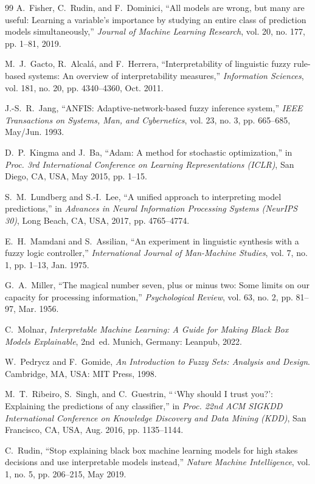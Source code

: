 \documentclass{report}
\begin{document}
\begin{thebibliography}{99}
A.~Fisher, C.~Rudin, and F.~Dominici, ``All models are wrong, but many are useful: Learning a variable's importance by studying an entire class of prediction models simultaneously,'' \emph{Journal of Machine Learning Research}, vol. 20, no. 177, pp. 1--81, 2019.

M.~J.~Gacto, R.~Alcal{\'a}, and F.~Herrera, ``Interpretability of linguistic fuzzy rule-based systems: An overview of interpretability measures,'' \emph{Information Sciences}, vol. 181, no. 20, pp. 4340--4360, Oct. 2011.

J.-S.~R.~Jang, ``ANFIS: Adaptive-network-based fuzzy inference system,'' \emph{IEEE Transactions on Systems, Man, and Cybernetics}, vol. 23, no. 3, pp. 665--685, May/Jun. 1993.

D.~P.~Kingma and J.~Ba, ``Adam: A method for stochastic optimization,'' in \emph{Proc. 3rd International Conference on Learning Representations (ICLR)}, San Diego, CA, USA, May 2015, pp. 1--15.

S.~M.~Lundberg and S.-I.~Lee, ``A unified approach to interpreting model predictions,'' in \emph{Advances in Neural Information Processing Systems (NeurIPS 30)}, Long Beach, CA, USA, 2017, pp. 4765--4774.

E.~H.~Mamdani and S.~Assilian, ``An experiment in linguistic synthesis with a fuzzy logic controller,'' \emph{International Journal of Man-Machine Studies}, vol. 7, no. 1, pp. 1--13, Jan. 1975.

G.~A.~Miller, ``The magical number seven, plus or minus two: Some limits on our capacity for processing information,'' \emph{Psychological Review}, vol. 63, no. 2, pp. 81--97, Mar. 1956.

C.~Molnar, \emph{Interpretable Machine Learning: A Guide for Making Black Box Models Explainable}, 2nd~ed. Munich, Germany: Leanpub, 2022.

W.~Pedrycz and F.~Gomide, \emph{An Introduction to Fuzzy Sets: Analysis and Design}. Cambridge, MA, USA: MIT Press, 1998.

M.~T.~Ribeiro, S.~Singh, and C.~Guestrin, ``\,`Why should I trust you?': Explaining the predictions of any classifier,'' in \emph{Proc. 22nd ACM SIGKDD International Conference on Knowledge Discovery and Data Mining (KDD)}, San Francisco, CA, USA, Aug. 2016, pp. 1135--1144.

C.~Rudin, ``Stop explaining black box machine learning models for high stakes decisions and use interpretable models instead,'' \emph{Nature Machine Intelligence}, vol. 1, no. 5, pp. 206--215, May 2019.


\end{thebibliography}
\end{document}
